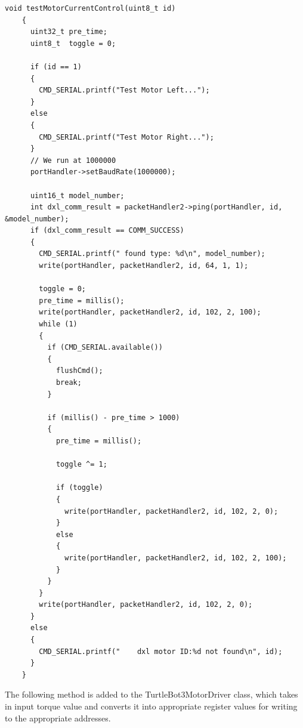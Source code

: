 \documentclass[12]{article}
\begin{document}
\begin{lstlisting}[style=C++]
    void testMotorCurrentControl(uint8_t id)
    {
      uint32_t pre_time;
      uint8_t  toggle = 0;
    
      if (id == 1)
      {
        CMD_SERIAL.printf("Test Motor Left...");
      }
      else
      {
        CMD_SERIAL.printf("Test Motor Right...");
      }
      // We run at 1000000
      portHandler->setBaudRate(1000000);
    
      uint16_t model_number;
      int dxl_comm_result = packetHandler2->ping(portHandler, id, &model_number);
      if (dxl_comm_result == COMM_SUCCESS)
      {
        CMD_SERIAL.printf(" found type: %d\n", model_number);
        write(portHandler, packetHandler2, id, 64, 1, 1);
    
        toggle = 0;
        pre_time = millis();
        write(portHandler, packetHandler2, id, 102, 2, 100);
        while (1)
        {
          if (CMD_SERIAL.available())
          {
            flushCmd();
            break;
          }
    
          if (millis() - pre_time > 1000)
          {
            pre_time = millis();
    
            toggle ^= 1;
    
            if (toggle)
            {
              write(portHandler, packetHandler2, id, 102, 2, 0);
            }
            else
            {
              write(portHandler, packetHandler2, id, 102, 2, 100);
            }
          }
        }
        write(portHandler, packetHandler2, id, 102, 2, 0);
      }
      else
      {
        CMD_SERIAL.printf("    dxl motor ID:%d not found\n", id);
      }
    }
\end{lstlisting}

The following method is added to the TurtleBot3MotorDriver class, which takes in input torque value and converts it into appropriate register values for writing to the appropriate addresses.
\end{document}
